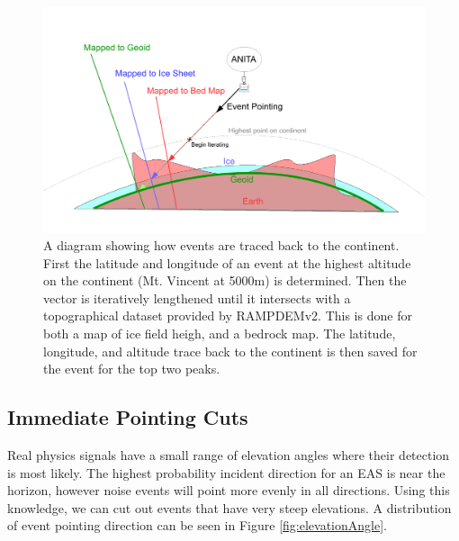 \begin{figure}
	\centering
	\includegraphics[height=0.5\textheight]{figures/traceBackToContinent}
	\caption{A diagram showing how events are traced back to the continent.  First the latitude and longitude of an event at the highest altitude on the continent (Mt. Vincent at 5000m) is determined.  Then the vector is iteratively lengthened until it intersects with a topographical dataset provided by RAMPDEMv2.  This is done for both a map of ice field heigh, and a bedrock map.  The latitude, longitude, and altitude trace back to the continent is then saved for the event for the top two peaks.} 
	\label{fig:traceBackToContinent}
\end{figure}	 
		
	\subsection{Immediate Pointing Cuts}
		Real physics signals have a small range of elevation angles where their detection is most likely.  The highest probability incident direction for an EAS is near the horizon, however noise events will point more evenly in all directions.  Using this knowledge, we can cut out events that have very steep elevations.  A distribution of event pointing direction can be seen in Figure \ref{fig:elevationAngle}.

